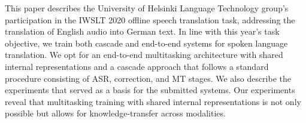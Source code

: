This paper describes the University of Helsinki Language Technology group's participation in the IWSLT 2020 offline speech translation task, addressing the translation of English audio into German text. In line with this year's task objective, we train both cascade and end-to-end systems for spoken language translation. We opt for an end-to-end multitasking architecture with shared internal representations and a cascade approach that follows a standard procedure consisting of ASR, correction, and MT stages. We also describe the experiments that served as a basis for the submitted systems. Our experiments reveal that multitasking training with shared internal representations is not only possible but allows for knowledge-transfer across modalities.
